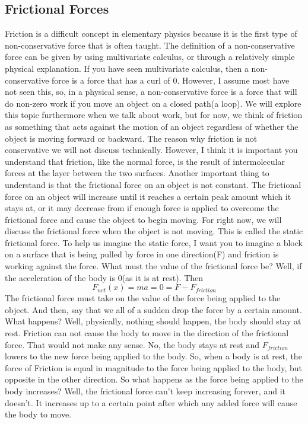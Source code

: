 \documentclass{article}[gray]
\numberwithin{equation}{subsection}
\begin{document}
\subsection{Frictional Forces}
Friction is a difficult concept in elementary physics because it is the first type of non-conservative force that is often taught. The definition of a non-conservative force can be given by using multivariate calculus, or through a relatively simple physical explanation. If you have seen multivariate calculus, then a non-conservative force is a force that has a curl of 0. However, I assume most have not seen this, so, in a physical sense, a non-conservative force is a force that will do non-zero work if you move an object on a closed path(a loop). We will explore this topic furthermore when we talk about work, but for now, we think of friction as something that acts against the motion of an object regardless of whether the object is moving forward or backward. The reason why friction is not conservative we will not discuss technically. However, I think it is important you understand that friction, like the normal force, is the result of intermolecular forces at the layer between the two surfaces. Another important thing to understand is that the frictional force on an object is not constant. The frictional force on an object will increase until it reaches a certain peak amount which it stays at, or it may decrease from if enough force is applied to overcome the frictional force and cause the object to begin moving. For right now, we will discuss the frictional force when the object is not moving. This is called the static frictional force. To help us imagine the static force, I want you to imagine a block on a surface that is being pulled by force in one direction(F) and friction is working against the force. What must the value of the frictional force be? Well, if the acceleration of the body is 0(as it is at rest). Then  \begin{equation}F_{net}\left(x\right)=ma=0=F-F_{friction}\end{equation} The frictional force must take on the value of the force being applied to the object. And then, say that we all of a sudden drop the force by a certain amount. What happens? Well, physically, nothing should happen, the body should stay at rest. Friction can not cause the body to move in the direction of the frictional force. That would not make any sense. No, the body stays at rest and $F_{friction}$ lowers to the new force being applied to the body. So, when a body is at rest, the force of Friction is equal in magnitude to the force being applied to the body, but opposite in the other direction. So what happens as the force being applied to the body increases? Well, the frictional force can’t keep increasing forever, and it doesn’t. It increases up to a certain point after which any added force will cause the body to move. 
\end{document}
